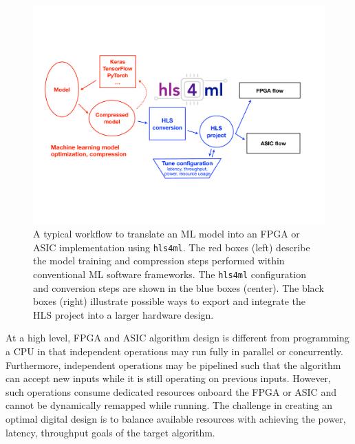 \documentclass[sigconf]{acmart}
\newcommand{\hlsfml}{\texttt{hls4ml}\xspace}
\begin{document}
\begin{figure}[t!]
\begin{center}
\includegraphics[width=0.99\columnwidth]{Figs/hls4ml-flow-4.pdf}
\end{center}
\caption{A typical workflow to translate an ML model into an FPGA or ASIC implementation using \hlsfml. 
The red boxes (left) describe the model training and compression steps performed within conventional ML software frameworks.
The \hlsfml configuration and conversion steps are shown in the blue boxes (center).
The black boxes (right) illustrate possible ways to export and integrate the HLS project into a larger hardware design.}
\label{fig:flow}
\end{figure}

At a high level, FPGA and ASIC algorithm design is different from programming a CPU in that independent operations may run fully in parallel or concurrently. 
Furthermore, independent operations may be pipelined such that the algorithm can accept new inputs while it is still operating on previous inputs.  
However, such operations consume dedicated resources onboard the FPGA or ASIC and cannot be dynamically remapped while running. 
The challenge in creating an optimal digital design is to balance available resources with achieving the power, latency, throughput goals of the target algorithm. 


\end{document}
